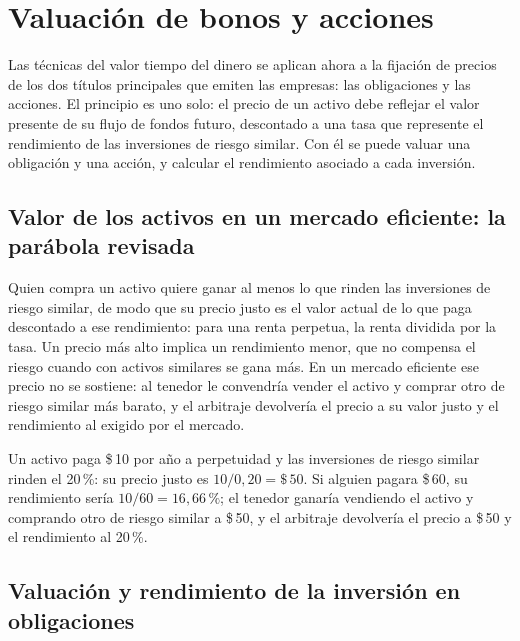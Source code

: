 \section{Valuación de bonos y acciones}\label{sec:u4-valuacion}

Las técnicas del valor tiempo del dinero  se aplican ahora a la fijación de precios de los dos títulos principales que emiten las empresas: las obligaciones y las acciones. El principio es uno solo: el precio de un activo debe reflejar el valor presente de su flujo de fondos futuro, descontado a una tasa que represente el rendimiento de las inversiones de riesgo similar. Con él se puede valuar una obligación y una acción, y calcular el rendimiento asociado a cada inversión.

\subsection{Valor de los activos en un mercado eficiente: la parábola revisada}

Quien compra un activo quiere ganar al menos lo que rinden las inversiones de riesgo similar, de modo que su precio justo es el valor actual de lo que paga descontado a ese rendimiento: para una renta perpetua, la renta dividida por la tasa. Un precio más alto implica un rendimiento menor, que no compensa el riesgo cuando con activos similares se gana más. En un mercado eficiente ese precio no se sostiene: al tenedor le convendría vender el activo y comprar otro de riesgo similar más barato, y el arbitraje devolvería el precio a su valor justo y el rendimiento al exigido por el mercado.

\begin{ejemplo}
Un activo paga \$\,10 por año a perpetuidad y las inversiones de riesgo similar rinden el 20\,\%: su precio justo es $10/0{,}20 = \$\,50$. Si alguien pagara \$\,60, su rendimiento sería $10/60 = 16{,}66\,\%$; el tenedor ganaría vendiendo el activo y comprando otro de riesgo similar a \$\,50, y el arbitraje devolvería el precio a \$\,50 y el rendimiento al 20\,\%.
\end{ejemplo}

\subsection{Valuación y rendimiento de la inversión en obligaciones}\label{sec:u4-bonos}

